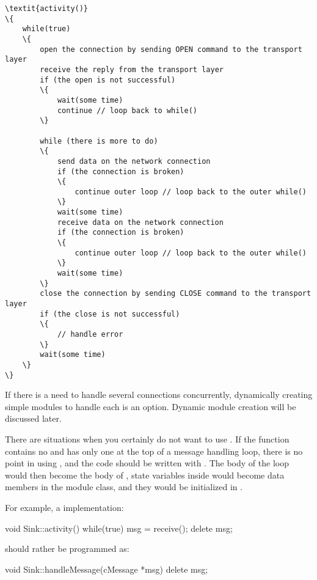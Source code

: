 \begin{Verbatim}[commandchars=\\\{\}]
\textit{activity()}
\{
    while(true)
    \{
        open the connection by sending OPEN command to the transport layer
        receive the reply from the transport layer
        if (the open is not successful)
        \{
            wait(some time)
            continue // loop back to while()
        \}

        while (there is more to do)
        \{
            send data on the network connection
            if (the connection is broken)
            \{
                continue outer loop // loop back to the outer while()
            \}
            wait(some time)
            receive data on the network connection
            if (the connection is broken)
            \{
                continue outer loop // loop back to the outer while()
            \}
            wait(some time)
        \}
        close the connection by sending CLOSE command to the transport layer
        if (the close is not successful)
        \{
            // handle error
        \}
        wait(some time)
    \}
\}
\end{Verbatim}

If there is a need to handle several connections concurrently, dynamically creating
simple modules to handle each is an option. Dynamic module creation will be discussed
later.

There are situations when you certainly do not want to use .
If the  function contains no  and has only one
 at the top of a message handling loop, there is no point in
using , and the code should be written with .
The body of the loop would then become the body of ,
state variables inside  would become data members in
the module class, and they would be initialized in .

For example, a  implementation:

\begin{cpp}
void Sink::activity()
{
    while(true) {
        msg = receive();
        delete msg;
    }
}
\end{cpp}

should rather be programmed as:

\begin{cpp}
void Sink::handleMessage(cMessage *msg)
{
    delete msg;
}
\end{cpp}



